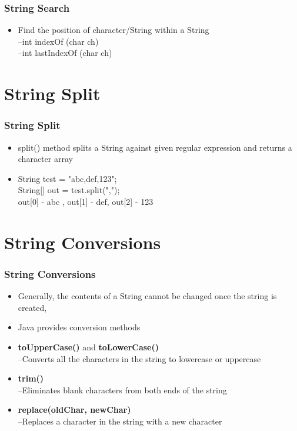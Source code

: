 \documentclass{beamer}
\begin{document}
\begin{frame}
\frametitle{String Search}
\begin{itemize}
\item Find the position of character/String within a String\\
–int indexOf (char ch)\\
–int lastIndexOf (char ch)\\
\end{itemize}
\end{frame}


\section{String Split}

\begin{frame}
\frametitle{String Split}
\begin{itemize}
\item split() method splits a String against given regular
expression and returns a character array
\item String test = "abc,def,123";\\
String[] out = test.split(",");\\
out[0] - abc , out[1] - def, out[2] - 123
\end{itemize}
\end{frame}


\section{String Conversions}

\begin{frame}
\frametitle{String Conversions}
\begin{itemize}
\item Generally, the contents of a String cannot be
changed once the string is created,
\item Java provides conversion methods
\item \textbf{toUpperCase()} and \textbf{toLowerCase()}\\
–Converts all the characters in the string to lowercase or
uppercase\\
\item \textbf{trim()}\\
–Eliminates blank characters from both ends of the string\\
\item \textbf{replace(oldChar, newChar)}\\
–Replaces a character in the string with a new character
\end{itemize}
\end{frame}
\end{document}
